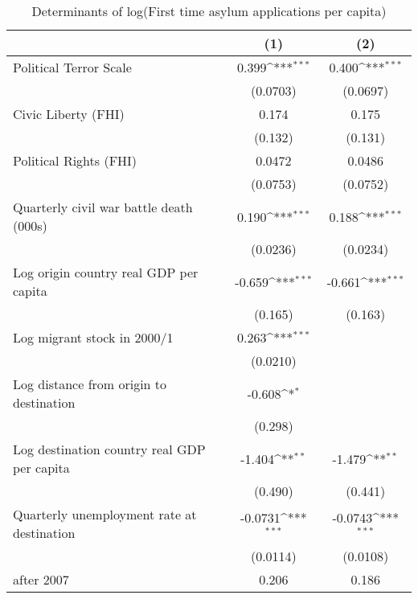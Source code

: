 \begin{table}[htbp]\centering
\def\sym#1{\ifmmode^{#1}\else\(^{#1}\)\fi}
\caption{Determinants of log(First time asylum applications per capita)}
\begin{tabular}{l*{2}{c}}
\hline\hline
                    &\multicolumn{1}{c}{(1)}         &\multicolumn{1}{c}{(2)}         \\
\hline
Political Terror Scale&       0.399\sym{***}&       0.400\sym{***}\\
                    &    (0.0703)         &    (0.0697)         \\
[1em]
Civic Liberty (FHI) &       0.174         &       0.175         \\
                    &     (0.132)         &     (0.131)         \\
[1em]
Political Rights (FHI)&      0.0472         &      0.0486         \\
                    &    (0.0753)         &    (0.0752)         \\
[1em]
Quarterly civil war battle death (000s)&       0.190\sym{***}&       0.188\sym{***}\\
                    &    (0.0236)         &    (0.0234)         \\
[1em]
Log origin country real GDP per capita&      -0.659\sym{***}&      -0.661\sym{***}\\
                    &     (0.165)         &     (0.163)         \\
[1em]
Log migrant stock in 2000/1&       0.263\sym{***}&                     \\
                    &    (0.0210)         &                     \\
[1em]
Log distance from origin to destination&      -0.608\sym{*}  &                     \\
                    &     (0.298)         &                     \\
[1em]
Log destination country real GDP per capita&      -1.404\sym{**} &      -1.479\sym{**} \\
                    &     (0.490)         &     (0.441)         \\
[1em]
Quarterly unemployment rate at destination&     -0.0731\sym{***}&     -0.0743\sym{***}\\
                    &    (0.0114)         &    (0.0108)         \\
[1em]
after 2007          &       0.206         &       0.186         \\

\end{tabular}
\end{table}
